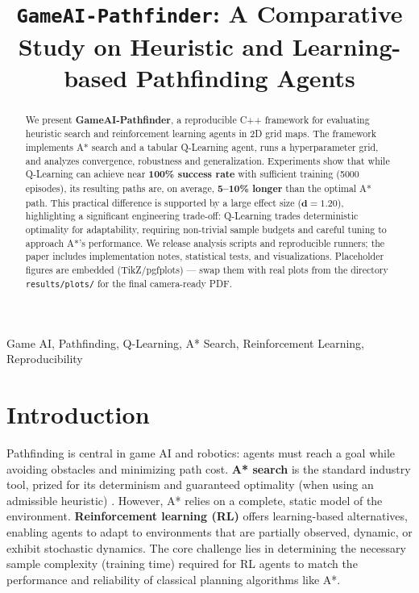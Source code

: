 \documentclass[conference]{IEEEtran}
\begin{document}
	
	\title{\texttt{GameAI-Pathfinder}: A Comparative Study on Heuristic and Learning-based Pathfinding Agents}
	
	\author{
	}
	
	\maketitle
	
	\begin{abstract}
		We present \textbf{GameAI-Pathfinder}, a reproducible C++ framework for evaluating
		heuristic search and reinforcement learning agents in 2D grid maps. The framework
		implements A* search and a tabular Q-Learning agent, runs a hyperparameter grid,
		and analyzes convergence, robustness and generalization. Experiments show that
		while Q-Learning can achieve near \textbf{100\% success rate} with sufficient training (5000 episodes), its resulting paths are, on average, \textbf{5--10\% longer} than the optimal A* path. This practical difference is supported by a large effect size ($\mathbf{d=1.20}$), highlighting a significant engineering trade-off: Q-Learning trades deterministic optimality for adaptability, requiring non-trivial sample budgets and careful tuning to approach A*'s performance. We release analysis scripts and reproducible runners; the paper includes implementation notes, statistical tests, and visualizations. Placeholder figures are embedded (TikZ/pgfplots)
		--- swap them with real plots from the directory \texttt{results/plots/} for the final camera-ready PDF.
	\end{abstract}
	
	\begin{IEEEkeywords}
		Game AI, Pathfinding, Q-Learning, A* Search, Reinforcement Learning, Reproducibility
	\end{IEEEkeywords}
	
	\section{Introduction}
	Pathfinding is central in game AI and robotics: agents must reach a goal while avoiding obstacles and minimizing path cost. \textbf{A* search} is the standard industry tool, prized for its determinism and guaranteed optimality (when using an admissible heuristic) \cite{hart1968formal}. However, A* relies on a complete, static model of the environment. \textbf{Reinforcement learning (RL)} offers learning-based alternatives, enabling agents to adapt to environments that are partially observed, dynamic, or exhibit stochastic dynamics. The core challenge lies in determining the necessary sample complexity (training time) required for RL agents to match the performance and reliability of classical planning algorithms like A*.
	
\end{document}
